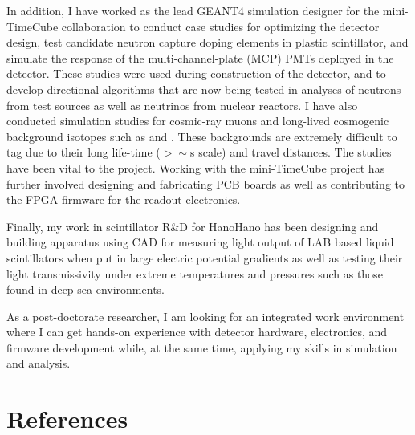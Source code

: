 \documentclass[a4paper,10pt]{article} %
\begin{document}
In addition, I have worked as the lead GEANT4 simulation designer for the
mini-TimeCube collaboration to conduct case studies for optimizing the detector
design, test candidate neutron capture doping elements in plastic scintillator,
and simulate the response of the multi-channel-plate (MCP) PMTs deployed in the
detector. These studies were used during construction of the detector, and to
develop directional algorithms that are now being tested in analyses of neutrons
from test sources as well as neutrinos from nuclear reactors. I have also
conducted simulation studies for cosmic-ray muons and long-lived cosmogenic
background isotopes such as  and . These backgrounds are
extremely difficult to tag due to their long life-time ($>\sim$\si{\second}
scale) and travel distances. The studies have been vital to the project. Working
with the mini-TimeCube project has further involved designing and fabricating
PCB boards as well as contributing to the FPGA firmware for the readout
electronics.

Finally, my work in scintillator R\&D for HanoHano has been designing and
building apparatus using CAD for measuring light output of LAB based liquid
scintillators when put in large electric potential gradients as well as testing
their light transmissivity under extreme temperatures and pressures such as
those found in deep-sea environments.

As a post-doctorate researcher, I am looking for an integrated work environment
where I can get hands-on experience with detector hardware, electronics, and
firmware development while, at the same time, applying my skills in simulation
and analysis.


\section{References}
\end{document}
